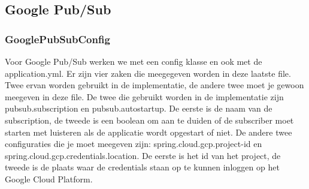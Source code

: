 \subsection{Google Pub/Sub}
\subsubsection{GooglePubSubConfig}
Voor Google Pub/Sub werken we met een config klasse en ook met de application.yml. Er zijn vier zaken die meegegeven worden in deze laatste file. Twee ervan worden gebruikt in de implementatie, de andere twee moet je gewoon meegeven in deze file. De twee die gebruikt worden in de implementatie zijn pubsub.subscription en pubsub.autostartup. De eerste is de naam van de subscription, de tweede is een boolean om aan te duiden of de subscriber moet starten met luisteren als de applicatie wordt opgestart of niet. De andere twee configuraties die je moet meegeven zijn: spring.cloud.gcp.project-id en spring.cloud.gcp.credentials.location. De eerste is het id van het project, de tweede is de plaats waar de credentials staan op te kunnen inloggen op het Google Cloud Platform. 

